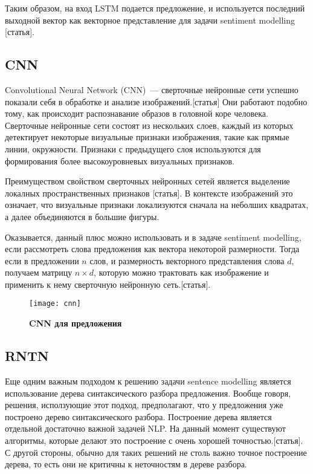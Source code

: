 Таким образом, на вход LSTM подается предложение, и используется последний выходной вектор как векторное представление для задачи sentiment modelling [статья].

\subsection{CNN}
Convolutional Neural Network (CNN)~--- сверточные нейронные сети успешно показали себя в обработке и анализе изображений.[статья] Они работают подобно тому, как происходит распознавание образов в головной коре человека. Сверточные нейронные сети состоят из нескольких слоев, каждый из которых детектирует некоторые визуальные признаки изображения, такие как прямые линии, окружности. Признаки с предыдущего слоя используются для формирования более высокоуровневых визуальных признаков.

Преимуществом свойством сверточных нейронных сетей является выделение локалных пространственных признаков [статья]. В контексте изображений это означает, что визуальные признаки локализуются сначала на неболших квадратах, а далее объединяются в большие фигуры.

Оказывается, данный плюс можно использовать и в задаче sentiment modelling, если рассмотреть слова предложения как вектора некоторой размерности. Тогда если в предложении $n$ слов, 
и размерность векторного представления слова $d$, получаем матрицу $n \times d$, 
которую можно трактовать как изображение и применить к нему сверточную нейронную сеть.[статья].

\begin{figure}[h]
\texttt{[image: cnn]}
\caption{\textbf{CNN для предложения}}
\label{fig:cnn}
\end{figure}

\subsection{RNTN}
Еще одним важным подходом к решению задачи sentence modelling является использование 
дерева синтаксического разбора предложения. Вообще говоря, решения, исползующие этот подход, предполагают, что у предложения уже построено дерево синтаксического разбора. Построение дерева является отдельной достаточно важной задачей NLP. На данный момент существуют алгоритмы, которые делают это построение с очень хорошей точностью.[статья]. 
С другой стороны, обычно для таких решений не столь важно точное построение дерева, то есть они не критичны к неточностям в дереве разбора.

